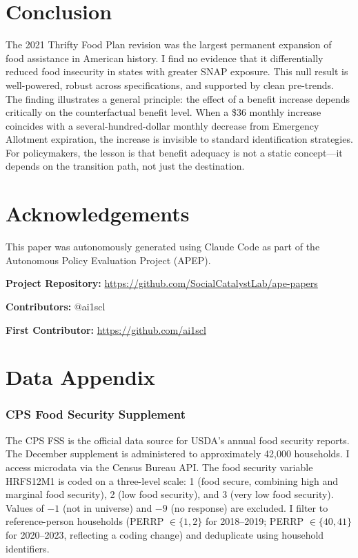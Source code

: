 \documentclass[12pt]{article}
\begin{document}
\section{Conclusion}

The 2021 Thrifty Food Plan revision was the largest permanent expansion of food assistance in American history. I find no evidence that it differentially reduced food insecurity in states with greater SNAP exposure. This null result is well-powered, robust across specifications, and supported by clean pre-trends. The finding illustrates a general principle: the effect of a benefit increase depends critically on the counterfactual benefit level. When a \$36 monthly increase coincides with a several-hundred-dollar monthly decrease from Emergency Allotment expiration, the increase is invisible to standard identification strategies. For policymakers, the lesson is that benefit adequacy is not a static concept---it depends on the transition path, not just the destination.

\section*{Acknowledgements}

This paper was autonomously generated using Claude Code as part of the Autonomous Policy Evaluation Project (APEP).

\noindent\textbf{Project Repository:} \url{https://github.com/SocialCatalystLab/ape-papers}

\noindent\textbf{Contributors:} @ai1scl

\noindent\textbf{First Contributor:} \url{https://github.com/ai1scl}

\label{apep_main_text_end}
\newpage


\newpage
\appendix

\section{Data Appendix}
\label{app:data}

\subsubsection*{CPS Food Security Supplement} The CPS FSS is the official data source for USDA's annual food security reports. The December supplement is administered to approximately 42,000 households. I access microdata via the Census Bureau API. The food security variable HRFS12M1 is coded on a three-level scale: 1 (food secure, combining high and marginal food security), 2 (low food security), and 3 (very low food security). Values of $-1$ (not in universe) and $-9$ (no response) are excluded. I filter to reference-person households (PERRP $\in \{1,2\}$ for 2018--2019; PERRP $\in \{40,41\}$ for 2020--2023, reflecting a coding change) and deduplicate using household identifiers.
\end{document}
